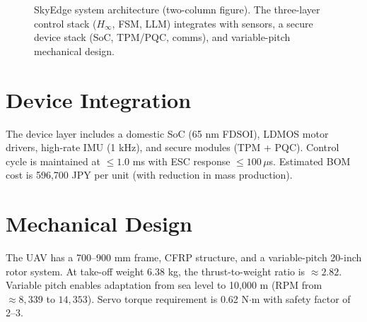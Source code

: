 \documentclass[conference]{IEEEtran}
\begin{document}
\begin{figure*}[t]
{%
}
\caption{SkyEdge system architecture (two-column figure). The three-layer control stack ($H_\infty$, FSM, LLM) integrates with sensors, a secure device stack (SoC, TPM/PQC, comms), and variable-pitch mechanical design.}
\label{fig:sysarch}
\end{figure*}

\section{Device Integration}
The device layer includes a domestic SoC (65 nm FDSOI), LDMOS motor 
drivers, high-rate IMU (1 kHz), and secure modules (TPM + PQC). 
Control cycle is maintained at $\leq 1.0$ ms with ESC response $\leq 100 
\, \mu$s. Estimated BOM cost is 596,700 JPY per unit (with reduction in 
mass production).

\section{Mechanical Design}
The UAV has a 700--900 mm frame, CFRP structure, and a variable-pitch 
20-inch rotor system. At take-off weight 6.38 kg, the thrust-to-weight 
ratio is $\approx 2.82$. Variable pitch enables adaptation from sea 
level to 10,000 m (RPM from $\approx 8,339$ to $14,353$). Servo torque 
requirement is 0.62 N$\cdot$m with safety factor of 2--3.
\end{document}
